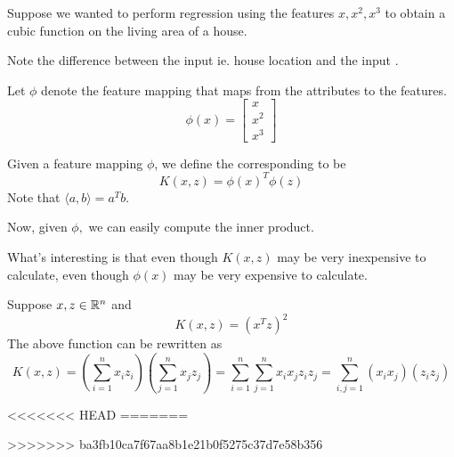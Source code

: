 \documentclass[12pt]{scrartcl}
\begin{document}
Suppose we wanted to perform regression using the features $x, x^2, x^3$ to
obtain a cubic function on the living area of a house.
\begin{note}
    Note the difference between the input  ie. house location and the input .
\end{note}
Let $\phi$ denote the feature mapping that maps from the attributes to the features.
\[\phi(x) = \begin{bmatrix}
        x \\ x^2\\x^3
    \end{bmatrix}\]
\begin{definition}
    Given a feature mapping $\phi$, we define the corresponding  to be
    \[K(x, z) = \phi(x)^T\phi(z)\]
    Note that $\langle a, b \rangle = a^Tb$.
\end{definition}
Now, given $\phi,$ we can easily compute the inner product.
\begin{note}
    What's interesting is that even though $K(x, z)$ may be very inexpensive to calculate, even though $\phi(x)$ may be very expensive to calculate.
\end{note}
\begin{example}
    Suppose $x, z \in \mathbb R^n$ and
    \[K(x, z) = (x^Tz)^2\]
    The above function can be rewritten as
    \[K(x, z) = (\sum_{i=1}^n x_iz_i)(\sum_{j=1}^nx_jz_j) =  \sum_{i=1}^n\sum_{j=1}^nx_ix_jz_iz_j = \sum_{i, j = 1}^n (x_ix_j)(z_iz_j)\]
\end{example}

<<<<<<< HEAD
=======


>>>>>>> ba3fb10ca7f67aa8b1e21b0f5275c37d7e58b356


\end{document}
